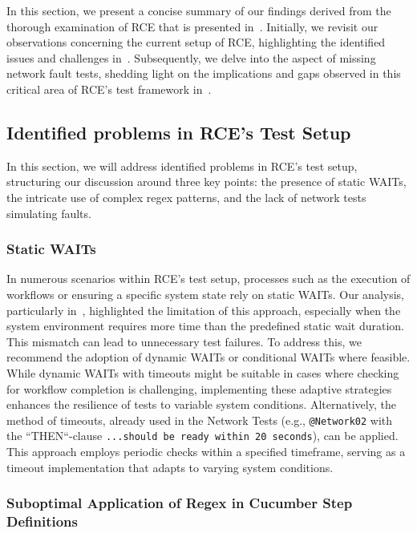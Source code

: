 In this section, we present a concise summary of our findings derived from the thorough examination of \ac{RCE} that is presented in~. Initially, we revisit our observations concerning the current setup of RCE, highlighting the identified issues and challenges in~. Subsequently, we delve into the aspect of missing network fault tests, shedding light on the implications and gaps observed in this critical area of RCE's test framework in~. 

\subsection{Identified problems in RCE's Test Setup}
\label{sub:identified-problems}
In this section, we will address identified problems in RCE's test setup, structuring our discussion around three key points: the presence of static WAITs, the intricate use of complex regex patterns, and the lack of network tests simulating faults.

\subsubsection{Static WAITs}
In numerous scenarios within \ac{RCE}'s test setup, processes such as the execution of workflows or ensuring a specific system state rely on static WAITs. Our analysis, particularly in~, highlighted the limitation of this approach, especially when the system environment requires more time than the predefined static wait duration. This mismatch can lead to unnecessary test failures. To address this, we recommend the adoption of dynamic WAITs or conditional WAITs where feasible. While dynamic WAITs with timeouts might be suitable in cases where checking for workflow completion is challenging, implementing these adaptive strategies enhances the resilience of tests to variable system conditions. Alternatively, the method of timeouts, already used in the Network Tests (e.g., \verb|@Network02| with the ``THEN``-clause \verb|...should be ready within 20 seconds|), can be applied. This approach employs periodic checks within a specified timeframe, serving as a timeout implementation that adapts to varying system conditions.


\subsubsection{Suboptimal Application of Regex in Cucumber Step Definitions}
\label{subsec:resultCucumber}

